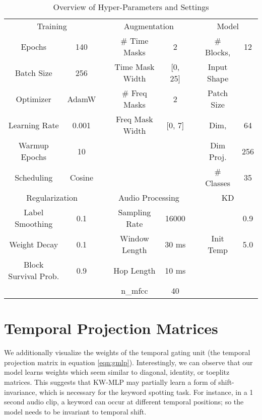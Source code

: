 \documentclass{article} \usepackage{iclr2022_conference,times}
\begin{document}
\begin{table}[ht]
	\centering
	\caption{Overview of Hyper-Parameters and Settings}
	\label{tbl:settings}
	\begin{tabular} {c c c c c c c c}
		\cline{1-2}  \cline{4-5} \cline{7-8}
		\multicolumn{2}{c}{Training} & & \multicolumn{2}{c}{Augmentation} & & \multicolumn{2}{c}{Model} \\
		\cline{1-2}  \cline{4-5} \cline{7-8}
		Epochs & 140 &  & \# Time Masks & 2 & &  \# Blocks,  & 12 \\
		Batch Size & 256 & & Time Mask Width & [0, 25] & &  Input Shape &  \\
		Optimizer & AdamW & & \# Freq Masks & 2 & &  Patch Size &  \\
		Learning Rate & 0.001 & & Freq Mask Width & [0, 7] & & Dim,  & 64 \\
		Warmup Epochs & 10 & & & & &  Dim Proj. & 256 \\
		Scheduling & Cosine &  & & & & \# Classes & 35 \\
		
		\cline{1-2}  \cline{4-5}  \cline{7-8}
		\multicolumn{2}{c}{Regularization} & & \multicolumn{2}{c}{Audio Processing} & & \multicolumn{2}{c}{KD}\\
		\cline{1-2}  \cline{4-5} \cline{7-8}
		Label Smoothing & 0.1 & & Sampling Rate & 16000 & &  & 0.9\\
		Weight Decay & 0.1 &  &  Window Length & 30 ms & & Init Temp & 5.0 \\
		Block Survival Prob. & 0.9 & &  Hop Length & 10 ms \\
		& & &  n\_mfcc & 40  \\

	\end{tabular}
\end{table}

\section{Temporal Projection Matrices}

We additionally visualize the weights of the temporal gating unit (the temporal projection matrix  in equation \ref{eqn:gmlp}). Interestingly, we can observe that our model learns weights which seem similar to diagonal, identity, or toeplitz matrices. This suggests that KW-MLP may partially learn a form of shift-invariance, which is necessary for the keyword spotting task. For instance, in a 1 second audio clip, a keyword can occur at different temporal positions; so the model needs to be invariant to temporal shift.
\end{document}
